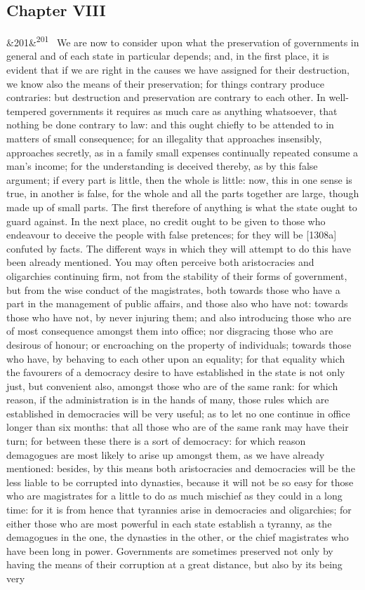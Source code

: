 \documentclass[12pt]{article}
\newcommand{\para}[1][]{\par\noindent\ifx&#1&\else\textsuperscript{\footnotesize #1}~\fi}
\begin{document}
\subsection*{Chapter VIII}

\para[201] We are now to consider upon what the preservation of governments in general and of each state in particular depends; and, in the first place, it is evident that if we are right in the causes we have assigned for their destruction, we know also the means of their preservation; for things contrary produce contraries: but destruction and preservation are contrary to each other. In well-tempered governments it requires as much care as anything whatsoever, that nothing be done contrary to law: and this ought chiefly to be attended to in matters of small consequence; for an illegality that approaches insensibly, approaches secretly, as in a family small expenses continually repeated consume a man's income; for the understanding is deceived thereby, as by this false argument; if every part is little, then the whole is little: now, this in one sense is true, in another is false, for the whole and all the parts together are large, though made up of small parts. The first therefore of anything is what the state ought to guard against. In the next place, no credit ought to be given to those who endeavour to deceive the people with false pretences; for they will be [1308a] confuted by facts. The different ways in which they will attempt to do this have been already mentioned. You may often perceive both aristocracies and oligarchies continuing firm, not from the stability of their forms of government, but from the wise conduct of the magistrates, both towards those who have a part in the management of public affairs, and those also who have not: towards those who have not, by never injuring them; and also introducing those who are of most consequence amongst them into office; nor disgracing those who are desirous of honour; or encroaching on the property of individuals; towards those who have, by behaving to each other upon an equality; for that equality which the favourers of a democracy desire to have established in the state is not only just, but convenient also, amongst those who are of the same rank: for which reason, if the administration is in the hands of many, those rules which are established in democracies will be very useful; as to let no one continue in office longer than six months: that all those who are of the same rank may have their turn; for between these there is a sort of democracy: for which reason demagogues are most likely to arise up amongst them, as we have already mentioned: besides, by this means both aristocracies and democracies will be the less liable to be corrupted into dynasties, because it will not be so easy for those who are magistrates for a little to do as much mischief as they could in a long time: for it is from hence that tyrannies arise in democracies and oligarchies; for either those who are most powerful in each state establish a tyranny, as the demagogues in the one, the dynasties in the other, or the chief magistrates who have been long in power. Governments are sometimes preserved not only by having the means of their corruption at a great distance, but also by its being very 
\end{document}
